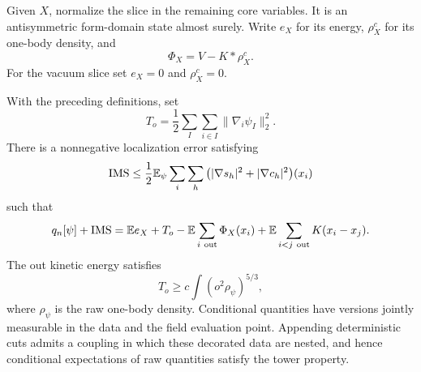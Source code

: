 Given $X$, normalize the slice in the remaining core variables.
It is an antisymmetric form-domain state almost surely.  Write $e_X$
for its energy, $\rho_X^c$ for its one-body density, and
\[
 \Phi_X=V-K*\rho_X^c.
\]
For the vacuum slice set $e_X=0$ and $\rho_X^c=0$.

\begin{lemma}
\label{lem:loc-identity}
With the preceding definitions, set
\[
 T_o=\frac12\sum_I\sum_{i\in I}\|\nabla_i\psi_I\|_2^2.
\]
There is a nonnegative localization error satisfying
\begin{equation}\label{eq:loc-error}
 \mathrm{IMS}\leq\frac12\mathbb E_\psi\sum_i\sum_h
       \big(|\nabla s_h|^2+|\nabla c_h|^2\big)(x_i)
\end{equation}
such that
\begin{equation}\label{eq:loc-cut}
 q_n[\psi]+\mathrm{IMS}
 =\mathbb E e_X+T_o-\mathbb E\sum_{i\ \mathrm{out}}\Phi_X(x_i)
                   +\mathbb E\sum_{i<j\ \mathrm{out}}K(x_i-x_j).
\end{equation}
The out kinetic energy satisfies
\[
 T_o\geq c\int(o^2\rho_\psi)^{5/3},
\]
where $\rho_\psi$ is the raw one-body density.  Conditional quantities
have versions jointly measurable in the data and the field evaluation
point.  Appending deterministic cuts admits a coupling in which these
decorated data are nested, and hence conditional expectations of raw
quantities satisfy the tower property.
\end{lemma}

